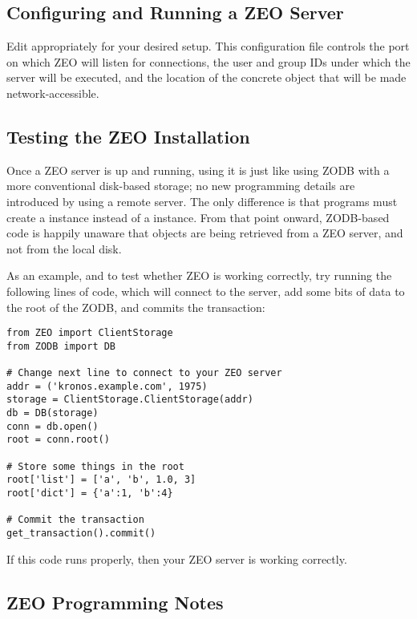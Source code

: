 \subsection{Configuring and Running a ZEO Server}

Edit  appropriately for your desired
setup.  This configuration file controls the port on which ZEO will
listen for connections, the user and group IDs under which the server
will be executed, and the location of the concrete 
object that will be made network-accessible.
 
\subsection{Testing the ZEO Installation}

Once a ZEO server is up and running, using it is just like using ZODB
with a more conventional disk-based storage; no new programming
details are introduced by using a remote server.  The only difference
is that programs must create a  instance instead
of a  instance.  From that point onward, ZODB-based
code is happily unaware that objects are being retrieved from a ZEO
server, and not from the local disk.

As an example, and to test whether ZEO is working correctly, try
running the following lines of code, which will connect to the server,
add some bits of data to the root of the ZODB, and commits the
transaction:

\begin{verbatim}
from ZEO import ClientStorage
from ZODB import DB

# Change next line to connect to your ZEO server
addr = ('kronos.example.com', 1975)
storage = ClientStorage.ClientStorage(addr)
db = DB(storage)
conn = db.open()
root = conn.root()

# Store some things in the root
root['list'] = ['a', 'b', 1.0, 3]
root['dict'] = {'a':1, 'b':4}

# Commit the transaction
get_transaction().commit()
\end{verbatim}

If this code runs properly, then your ZEO server is working correctly.

\subsection{ZEO Programming Notes}

